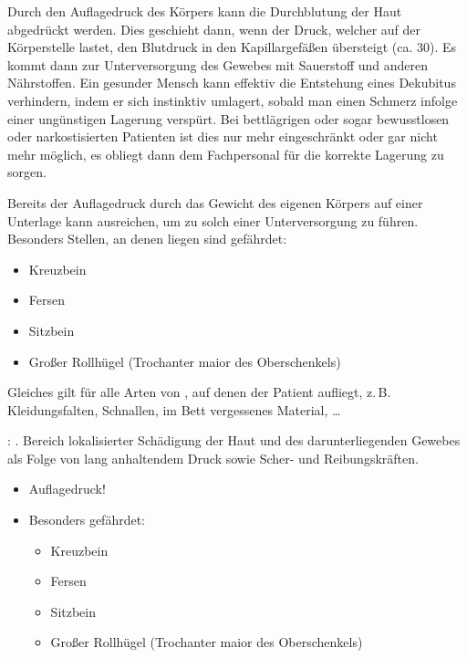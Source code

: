 {\TxBeschreibung}
{%
Durch den Auflagedruck des Körpers kann die 
Durchblutung der Haut abgedrückt werden. Dies geschieht dann,
wenn der Druck, welcher auf der Körperstelle lastet, den
Blutdruck in den Kapillargefäßen übersteigt (ca. 30\MmHg*).
Es kommt dann zur Unterversorgung des Gewebes mit Sauerstoff
und anderen Nährstoffen. Ein gesunder Mensch kann effektiv 
die Entstehung eines Dekubitus verhindern, indem er
sich instinktiv umlagert, sobald man einen Schmerz infolge
einer ungünstigen Lagerung verspürt. Bei bettlägrigen oder 
sogar bewusstlosen oder narkostisierten
Patienten ist dies nur mehr eingeschränkt oder gar nicht
mehr möglich, es obliegt dann dem Fachpersonal für die
korrekte Lagerung zu sorgen.

Bereits der Auflagedruck durch das
Gewicht des eigenen Körpers auf einer Unterlage kann
ausreichen, um zu solch einer
Unterversorgung zu führen. Besonders Stellen, an denen
 liegen sind gefährdet:
\begin{itemize}
  \item Kreuzbein
  \item Fersen
  \item Sitzbein
  \item Großer Rollhügel (Trochanter maior des
  Oberschenkels)
\end{itemize}
Gleiches gilt für alle Arten
von , auf denen der Patient aufliegt,
z.\,B.
Kleidungsfalten, Schnallen, im Bett vergessenes
Material, \ldots 

}
{: . Bereich
lokalisierter Schädigung der Haut und des darunterliegenden Gewebes als Folge von 
lang anhaltendem Druck sowie Scher- und Reibungskräften.
\begin{itemize}
  \item Auflagedruck!
  \item Besonders gefährdet:
  \begin{itemize}
    \item Kreuzbein
    \item Fersen
    \item Sitzbein
    \item Großer Rollhügel (Trochanter maior des
    Oberschenkels)
  \end{itemize}
\end{itemize}
}
{}
{}
{}


